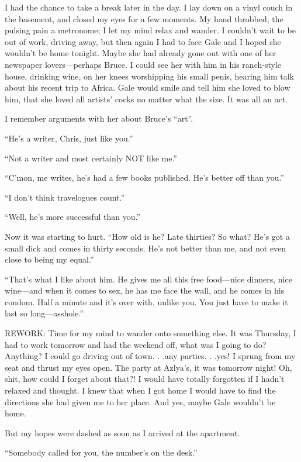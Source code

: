 I had the chance to take a break later in the day. I lay down on a vinyl
couch in the basement, and closed my eyes for a few moments. My hand
throbbed, the pulsing pain a metronome; I let my mind relax and wander.
I couldn't wait to be out of work, driving away, but then again I had to
face Gale and I hoped she wouldn't be home tonight. Maybe she had
already gone out with one of her newspaper lovers---perhaps Bruce. I
could see her with him in his ranch-style house, drinking wine, on her
knees worshipping his small penis, hearing him talk about his recent
trip to Africa. Gale would smile and tell him she loved to blow him,
that she loved all artists' cocks no matter what the size. It was all an
act.

I remember arguments with her about Bruce's ``art''.

``He's a writer, Chris, just like you.''

``Not a writer and most certainly NOT like me.''

``C'mon, me writes, he's had a few books published. He's better off than
you.''

``I don't think travelogues count.''

``Well, he's more successful than you.''

Now it was starting to hurt. ``How old is he? Late thirties? So what?
He's got a small dick and comes in thirty seconds. He's not better than
me, and not even close to being my equal.''

``That's what I like about him. He gives me all this free food---nice
dinners, nice wine---and when it comes to sex, he has me face the wall,
and he comes in his condom. Half a minute and it's over with, unlike
you. You just have to make it last so long---asshole.''

REWORK: Time for my mind to wander onto something else. It was Thursday,
I had to work tomorrow and had the weekend off, what was I going to do?
Anything? I could go driving out of town. . .any parties. . .yes! I
sprung from my seat and thrust my eyes open. The party at Azlya's, it
was tomorrow night! Oh, shit, how could I forget about that?! I would
have totally forgotten if I hadn't relaxed and thought. I knew that when
I got home I would have to find the directions she had given me to her
place. And yes, maybe Gale wouldn't be home.

But my hopes were dashed as soon as I arrived at the apartment.

``Somebody called for you, the number's on the desk.''

